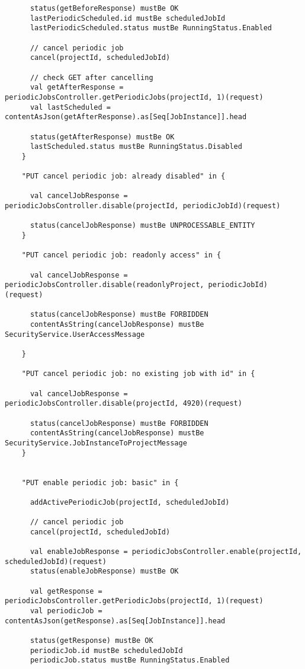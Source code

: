 \begin{lstlisting}
      status(getBeforeResponse) mustBe OK
      lastPeriodicScheduled.id mustBe scheduledJobId
      lastPeriodicScheduled.status mustBe RunningStatus.Enabled

      // cancel periodic job
      cancel(projectId, scheduledJobId)

      // check GET after cancelling
      val getAfterResponse = periodicJobsController.getPeriodicJobs(projectId, 1)(request)
      val lastScheduled = contentAsJson(getAfterResponse).as[Seq[JobInstance]].head

      status(getAfterResponse) mustBe OK
      lastScheduled.status mustBe RunningStatus.Disabled
    }

    "PUT cancel periodic job: already disabled" in {

      val cancelJobResponse = periodicJobsController.disable(projectId, periodicJobId)(request)

      status(cancelJobResponse) mustBe UNPROCESSABLE_ENTITY
    }

    "PUT cancel periodic job: readonly access" in {

      val cancelJobResponse = periodicJobsController.disable(readonlyProject, periodicJobId)(request)

      status(cancelJobResponse) mustBe FORBIDDEN
      contentAsString(cancelJobResponse) mustBe SecurityService.UserAccessMessage

    }

    "PUT cancel periodic job: no existing job with id" in {

      val cancelJobResponse = periodicJobsController.disable(projectId, 4920)(request)

      status(cancelJobResponse) mustBe FORBIDDEN
      contentAsString(cancelJobResponse) mustBe SecurityService.JobInstanceToProjectMessage
    }


    "PUT enable periodic job: basic" in {

      addActivePeriodicJob(projectId, scheduledJobId)

      // cancel periodic job
      cancel(projectId, scheduledJobId)

      val enableJobResponse = periodicJobsController.enable(projectId, scheduledJobId)(request)
      status(enableJobResponse) mustBe OK

      val getResponse = periodicJobsController.getPeriodicJobs(projectId, 1)(request)
      val periodicJob = contentAsJson(getResponse).as[Seq[JobInstance]].head

      status(getResponse) mustBe OK
      periodicJob.id mustBe scheduledJobId
      periodicJob.status mustBe RunningStatus.Enabled


\end{lstlisting}
